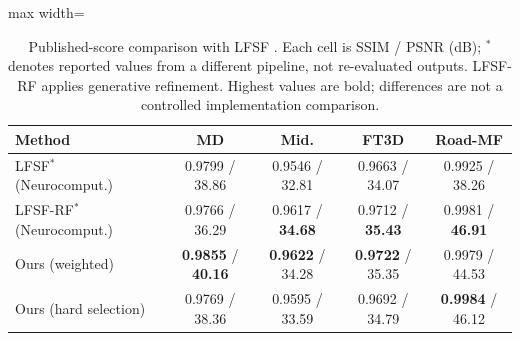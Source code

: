 \begin{table}[htbp]
\centering
\footnotesize
\setlength{\tabcolsep}{2.7pt}
\caption{Published-score comparison with LFSF \cite{li2026lfsf}. Each cell is SSIM / PSNR (dB); $^\ast$ denotes reported values from a different pipeline, not re-evaluated outputs. LFSF-RF applies generative refinement. Highest values are bold; differences are not a controlled implementation comparison.}
\label{tab:lfsf}
\begin{adjustbox}{max width=\textwidth}
\begin{tabular}{lcccc}
\toprule
Method & MD & Mid. & FT3D & Road-MF \\
\midrule
LFSF$^\ast$ (Neurocomput.)~\cite{li2026lfsf} & 0.9799 / 38.86 & 0.9546 / 32.81 & 0.9663 / 34.07 & 0.9925 / 38.26 \\
LFSF-RF$^\ast$ (Neurocomput.)~\cite{li2026lfsf} & 0.9766 / 36.29 & 0.9617 / \textbf{34.68} & 0.9712 / \textbf{35.43} & 0.9981 / \textbf{46.91} \\
Ours (weighted) & \textbf{0.9855} / \textbf{40.16} & \textbf{0.9622} / 34.28 & \textbf{0.9722} / 35.35 & 0.9979 / 44.53 \\
Ours (hard selection) & 0.9769 / 38.36 & 0.9595 / 33.59 & 0.9692 / 34.79 & \textbf{0.9984} / 46.12 \\
\bottomrule
\end{tabular}
\end{adjustbox}
\end{table}
